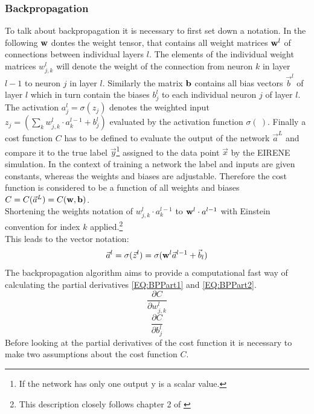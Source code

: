 			\subsubsection{Backpropagation}
				\label{BackProp}
				To talk about backpropagation it is necessary to first set down a notation. In the following $\mathbf{w}$ dontes the weight tensor, that contains all weight matrices $\mathbf{w}^l$ of connections between individual layers $l$. The elements of the individual weight matrices $w^l_{j,k}$ will denote the weight of the connection from neuron $k$ in layer $l-1$ to neuron $j$ in layer $l$. Similarly the matrix $\mathbf{b}$ contains all bias vectors $\vec{b}^l$ of layer $l$ which in turn contain the biases $b^l_j$ to each individual neuron $j$ of layer $l$.\\
				The activation $a^l_j = \sigma(z_j)$ denotes the weighted input $z_j = \left( \sum^{}_{k} w^l_{j,k} \cdot a^{l-1}_k + b^l_j \right)$ evaluated by the activation function $\sigma(\:)$. Finally a cost function $C$ has to be defined to evaluate the output of the network $\vec{a}^L$ and compare it to the true label $\vec{y}$\footnote{If the network has only one output y is a scalar value.} assigned to the data point $\vec{x}$ by the EIRENE simulation. In the context of training a network the label and inputs are given constants, whereas the weights and biases are adjustable. Therefore the cost function is considered to be a function of all weights and biases $C = C(\vec{a}^L) = C(\mathbf{w}, \mathbf{b})$.\\
				Shortening the weights notation of $w^l_{j,k} \cdot a^{l-1}_k$ to $\mathbf{w}^l \cdot a^{l-1}$ with Einstein convention for index $k$ applied.\footnote{This description closely follows chapter 2 of \cite{NNEBook}}\\
				This leads to the vector notation:
				\begin{equation}
					\vec{a}^l = \sigma(\vec{z}^l) = \sigma(\mathbf{w}^l \vec{a}^{l-1} + \vec{b}_l)
					\label{EQ:Activation}
				\end{equation}
				The backpropagation algorithm aims to provide a computational fast way of calculating the partial derivatives \ref{EQ:BPPart1} and \ref{EQ:BPPart2}. 
				\begin{equation}
					\frac{\partial C}{\partial w^l_{j,k}}
					\label{EQ:BPPart1}
				\end{equation}
				\begin{equation}
					\frac{\partial C}{\partial b^l_j}
					\label{EQ:BPPart2}
				\end{equation}
				Before looking at the partial derivatives of the cost function it is necessary to make two assumptions about the cost function $C$.			
